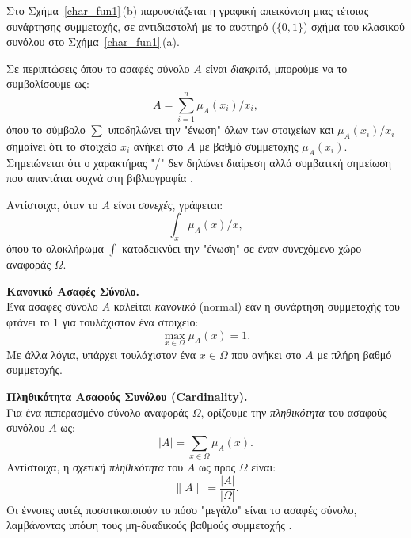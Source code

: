 Στο Σχήμα~\ref{char_fun1}\,(\textlatin{b}) παρουσιάζεται η γραφική απεικόνιση μιας τέτοιας συνάρτησης συμμετοχής, σε αντιδιαστολή με το αυστηρό (\(\{0,1\}\)) σχήμα του κλασικού συνόλου στο Σχήμα~\ref{char_fun1}\,(\textlatin{a}). 

\medskip
Σε περιπτώσεις όπου το ασαφές σύνολο \(A\) είναι \emph{διακριτό}, μπορούμε να το συμβολίσουμε ως:
\begin{equation}
\label{eq:2}
A = \sum_{i=1}^{n} \mu_{A}(x_{i})/x_{i},
\end{equation}
όπου το σύμβολο \(\sum\) υποδηλώνει την "ένωση" όλων των στοιχείων και \(\mu_{A}(x_{i})/x_{i}\) σημαίνει ότι το στοιχείο \(x_{i}\) ανήκει στο \(A\) με βαθμό συμμετοχής \(\mu_{A}(x_{i})\). Σημειώνεται ότι ο χαρακτήρας "/" δεν δηλώνει διαίρεση αλλά συμβατική σημείωση που απαντάται συχνά στη βιβλιογραφία \cite{DuboisPrade1980}.

\medskip
Αντίστοιχα, όταν το \(A\) είναι \emph{συνεχές}, γράφεται:
\begin{equation}
\label{eq:3}
\int_{x} \mu_{A}(x)/x,
\end{equation}
όπου το ολοκλήρωμα \(\int\) καταδεικνύει την "ένωση" σε έναν συνεχόμενο χώρο αναφοράς \(\Omega\).

\begin{definition}
	\label{def:normal}
	\textbf{Κανονικό Ασαφές Σύνολο.}\\
	Ένα ασαφές σύνολο \(A\) καλείται \emph{κανονικό} (\textlatin{normal}) εάν η συνάρτηση συμμετοχής του φτάνει το 1 για τουλάχιστον ένα στοιχείο:
	\begin{equation}
	\label{eq:4}
	\max_{x \in \Omega} \mu_{A}(x) = 1.
	\end{equation}
	Με άλλα λόγια, υπάρχει τουλάχιστον ένα \(x \in \Omega\) που ανήκει στο \(A\) με πλήρη βαθμό συμμετοχής.
\end{definition}

\begin{definition}
	\textbf{Πληθικότητα Ασαφούς Συνόλου (Cardinality).}\\
	Για ένα πεπερασμένο σύνολο αναφοράς \(\Omega\), ορίζουμε την \emph{πληθικότητα} του ασαφούς συνόλου \(A\) ως:
	\begin{equation}
	\label{eq:5}
	|A| = \sum_{x \in \Omega} \mu_{A}(x).
	\end{equation}
	Αντίστοιχα, η \emph{σχετική πληθικότητα} του \(A\) ως προς \(\Omega\) είναι:
	\begin{equation}
	\|A\| = \frac{|A|}{|\Omega|}.
	\end{equation}
	Οι έννοιες αυτές ποσοτικοποιούν το πόσο "μεγάλο" είναι το ασαφές σύνολο, λαμβάνοντας υπόψη τους μη-δυαδικούς βαθμούς συμμετοχής \cite{KlirYuan}.
\end{definition}


